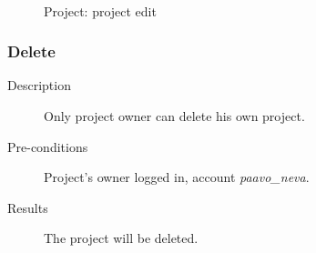 \begin{figure}[bth]
\myfloatalign
{} \quad
{} \\
\caption[Project: project edit]{Project:  project edit}
\label{fig:user_guide:project:project_edit}
\end{figure}

\clearpage

\subsubsection{Delete}
\label{ch:result:user_guide:project:delete}

\begin{description}
\item[Description] Only project owner can delete his own project.
\item[Pre-conditions] Project's owner logged in, \eg account \emph{paavo\_neva}.
\item[Results] The project will be deleted.
\end{description}

